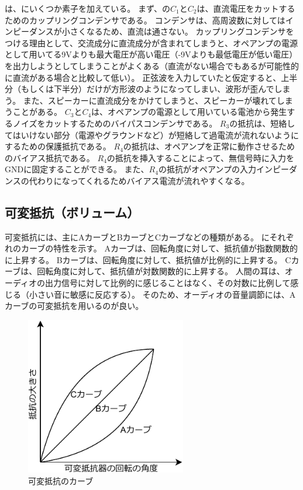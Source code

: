 \documentclass[report.tex]{subfiles}
\begin{document}
は、にいくつか素子を加えている。
まず、の\(C_1\)と\(C_2\)は、直流電圧をカットするためのカップリングコンデンサである。
コンデンサは、高周波数に対してはインピーダンスが小さくなるため、直流は通さない。
カップリングコンデンサをつける理由として、交流成分に直流成分が含まれてしまうと、オペアンプの電源として用いてる9Vよりも最大電圧が高い電圧（-9Vよりも最低電圧が低い電圧）を出力しようとしてしまうことがよくある（直流がない場合でもあるが可能性的に直流がある場合と比較して低い）。
正弦波を入力していたと仮定すると、上半分（もしくは下半分）だけが方形波のようになってしまい、波形が歪んでしまう。
また、スピーカーに直流成分をかけてしまうと、スピーカーが壊れてしまうことがある。
\(C_3\)と\(C_4\)は、オペアンプの電源として用いている電池から発生するノイズをカットするためのバイパスコンデンサである。
\(R_3\)の抵抗は、短絡してはいけない部分（電源やグラウンドなど）が短絡して過電流が流れないようにするための保護抵抗である。
\(R_4\)の抵抗は、オペアンプを正常に動作させるためのバイアス抵抗である。
\(R_4\)の抵抗を挿入することによって、無信号時に入力をGNDに固定することができる。
また、\(R_4\)の抵抗がオペアンプの入力インピーダンスの代わりになってくれるためバイアス電流が流れやすくなる。

\subsection{可変抵抗（ボリューム）}

可変抵抗には、主にAカーブとBカーブとCカーブなどの種類がある。
にそれぞれのカーブの特性を示す。
Aカーブは、回転角度に対して、抵抗値が指数関数的に上昇する。
Bカーブは、回転角度に対して、抵抗値が比例的に上昇する。
Cカーブは、回転角度に対して、抵抗値が対数関数的に上昇する。
人間の耳は、オーディオの出力信号に対して比例的に感じることはなく、その対数に比例して感じる（小さい音に敏感に反応する）。
そのため、オーディオの音量調節には、Aカーブの可変抵抗を用いるのが良い。

\begin{figure}[H]
	\centering
	\includegraphics[width=7cm]{fig/cabe.pdf}
	\caption{可変抵抗のカーブ}
	\label{fig:cabe}
\end{figure}
\end{document}
